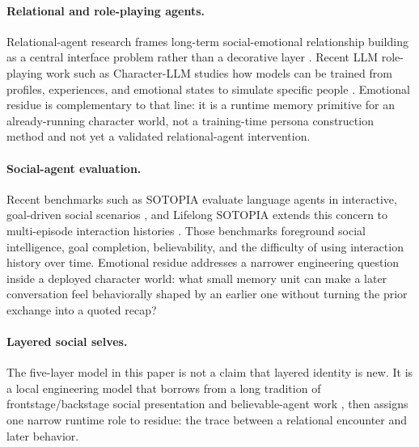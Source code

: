 \documentclass[11pt]{article}
\begin{document}
\paragraph{Relational and role-playing agents.}
Relational-agent research frames long-term social-emotional relationship building as a central interface problem rather than a decorative layer \cite{bickmore2005relational}. Recent LLM role-playing work such as Character-LLM studies how models can be trained from profiles, experiences, and emotional states to simulate specific people \cite{shao2023characterllm}. Emotional residue is complementary to that line: it is a runtime memory primitive for an already-running character world, not a training-time persona construction method and not yet a validated relational-agent intervention.

\paragraph{Social-agent evaluation.}
Recent benchmarks such as SOTOPIA evaluate language agents in interactive, goal-driven social scenarios \cite{sotopia}, and Lifelong SOTOPIA extends this concern to multi-episode interaction histories \cite{lifelongsotopia}. Those benchmarks foreground social intelligence, goal completion, believability, and the difficulty of using interaction history over time. Emotional residue addresses a narrower engineering question inside a deployed character world: what small memory unit can make a later conversation feel behaviorally shaped by an earlier one without turning the prior exchange into a quoted recap?

\paragraph{Layered social selves.}
The five-layer model in this paper is not a claim that layered identity is new. It is a local engineering model that borrows from a long tradition of frontstage/backstage social presentation \cite{goffman1959presentation} and believable-agent work \cite{bates1994role}, then assigns one narrow runtime role to residue: the trace between a relational encounter and later behavior.
\end{document}

